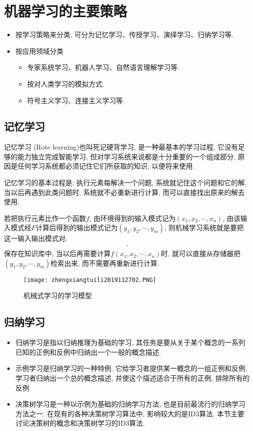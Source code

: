 \section{机器学习的主要策略}
\begin{itemize}
\item 按学习策略来分类, 可分为记忆学习、传授学习、演绎学习、归纳学习等.

\item 按应用领域分类
    \begin{itemize}
      \item 专家系统学习、机器人学习、自然语言理解学习等.
      \item 按对人类学习的模拟方式.
      \item 符号主义学习、连接主义学习等.
    \end{itemize}
\end{itemize}
\subsection{记忆学习}

记忆学习 (Rote learning)也叫死记硬背学习, 是一种最基本的学习过程, 它没有足够的能力独立完成智能学习, 但对学习系统来说都是十分重要的一个组成部分, 原因是任何学习系统都必须记住它们所获取的知识, 以便将来使用.

记忆学习的基本过程是: 执行元素每解决一个问题, 系统就记住这个问题和它的解, 当以后再遇到此类问题时, 系统就不必重新进行计算, 而可以直接找出原来的解去使用.

若把执行元素比作一个函数$f$, 由环境得到的输入模式记为$ (x_1,x_2,\cdots ,x_n)$, 由该输入模式经$F$计算后得到的输出模式记为$ (y_1,y_2,\cdots ,y_m)$, 则机械学习系统就是要把这一输入输出模式对:
\begin{align}
  [ (x_1,x_2,\cdots ,x_n) , (y_1,y_2,\cdots ,y_m)],
\end{align}
保存在知识库中, 当以后再需要计算$f (x_1,x_2,\cdots ,x_n)$时, 就可以直接从存储器把$ (y_1,y_2,\cdots ,y_m)$检索出来, 而不需要再重新进行计算.
\begin{figure}[H]
\centering
\texttt{[image: zhengxiangtuili2019112702.PNG]}
\caption{机械式学习的学习模型}
\label{AI32fig2702}
\end{figure}
\subsection{归纳学习}
\begin{itemize}
\item 归纳学习是指以归纳推理为基础的学习, 其任务是要从关于某个概念的一系列已知的正例和反例中归纳出一个一般的概念描述.
\item 示例学习是归纳学习的一种特例. 它给学习者提供某一概念的一组正例和反例, 学习者归纳出一个总的概念描述, 并使这个描述适合于所有的正例, 排除所有的反例.
\item 决策树学习是一种以示例为基础的归纳学习方法, 也是目前最流行的归纳学习方法之一. 在现有的各种决策树学习算法中, 影响较大的是ID3算法. 本节主要讨论决策树的概念和决策树学习的ID3算法.
\end{itemize}
